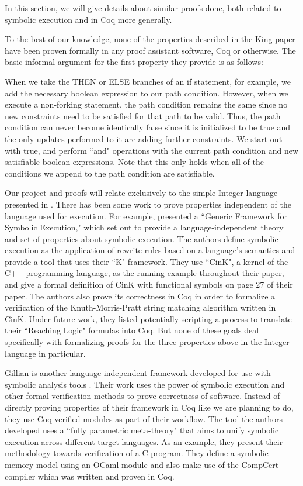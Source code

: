 \documentclass[11pt,conference]{IEEEtran}
\begin{document}
In this section, we will give details about similar proofs done, both related to symbolic execution and in Coq more generally.

To the best of our knowledge, none of the properties described in the King paper have been proven formally in any proof assistant software, Coq or otherwise. The basic informal argument for the first property they provide is as follows: 

When we take the THEN or ELSE branches of an if statement, for example, we add the necessary boolean expression to our path condition. However, when we execute a non-forking statement, the path condition remains the same since no new constraints need to be satisfied for that path to be valid. Thus, the path condition can never become identically false since it is initialized to be true and the only updates performed to it are adding further constraints. We start out with true, and perform ``and" operations with the current path condition and new satisfiable boolean expressions. Note that this only holds when all of the conditions we append to the path condition are satisfiable.

Our project and proofs will relate exclusively to the simple Integer language presented in \cite{b1}. There has been some work to prove properties independent of the language used for execution. For example, \cite{b2} presented a ``Generic Framework for Symbolic Execution," which set out to provide a language-independent theory and set of properties about symbolic execution. The authors define symbolic execution as the application of rewrite rules based on a language's semantics and provide a tool that uses their ``K" framework. They use ``CinK", a kernel of the C++ programming language, as the running example throughout their paper, and give a formal definition of CinK with functional symbols on page 27 of their paper. The authors also prove its correctness in Coq in order to formalize a verification of the Knuth-Morris-Pratt string matching algorithm written in CinK. Under future work, they listed potentially scripting a process to translate their ``Reaching Logic" formulas into Coq. But none of these goals deal specifically with formalizing proofs for the three properties above in the Integer language in particular.

Gillian is another language-independent framework developed for use with symbolic analysis tools \cite{b3}. Their work uses the power of symbolic execution and other formal verification methods to prove correctness of software. Instead of directly proving properties of their framework in Coq like we are planning to do, they use Coq-verified modules as part of their workflow. The tool the authors developed uses a ``fully parametric meta-theory" that aims to unify symbolic execution across different target languages. As an example, they present their methodology towards verification of a C program. They define a symbolic memory model using an OCaml module and also make use of the CompCert compiler which was written and proven in Coq. 
\end{document}
